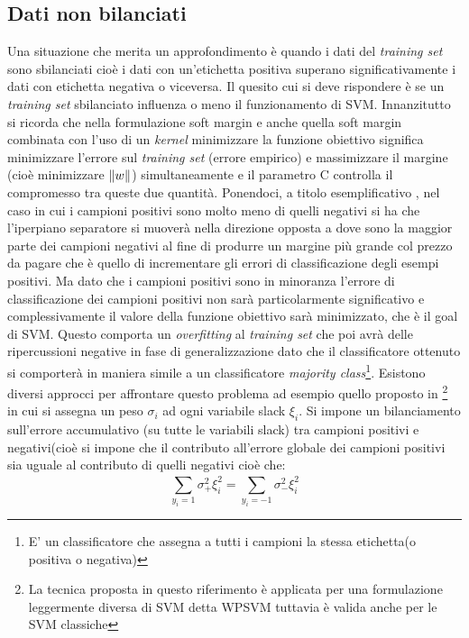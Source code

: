 \subsection{Dati non bilanciati}
\label{sub:unbalanced}
Una situazione che merita un approfondimento è quando i dati del \textit{training set} sono sbilanciati cioè  i dati con un'etichetta positiva superano significativamente i dati con etichetta negativa o viceversa. Il quesito cui si deve rispondere è se un \textit{training set} sbilanciato influenza o meno il funzionamento di \ac{SVM}. Innanzitutto si ricorda che nella formulazione soft margin e anche quella soft margin combinata con l'uso di un \textit{kernel} minimizzare la funzione obiettivo significa minimizzare l'errore sul \textit{training set} (errore empirico) e massimizzare il margine (cioè minimizzare $\lVert w\rVert$) simultaneamente e il parametro C controlla il compromesso tra queste due quantità. Ponendoci, a titolo esemplificativo , nel caso in cui i campioni positivi sono molto meno di quelli negativi si ha che l'iperpiano separatore si muoverà nella direzione opposta a dove sono la maggior parte dei campioni negativi al fine di produrre un margine più grande col prezzo da pagare che è quello di incrementare gli errori di classificazione degli esempi positivi. Ma dato che i campioni positivi sono in minoranza l'errore di classificazione dei campioni positivi non sarà particolarmente significativo e complessivamente il valore della funzione obiettivo sarà minimizzato, che è il goal di \ac{SVM}. Questo comporta un \textit{overfitting} al \textit{training set} che poi avrà delle ripercussioni negative in fase di generalizzazione dato che il classificatore ottenuto si comporterà in maniera simile a un classificatore \textit{majority class}\footnote{E' un classificatore che assegna a tutti i campioni la stessa etichetta(o positiva o negativa)}. Esistono diversi approcci per affrontare questo problema ad esempio quello proposto in \cite{Zhang05}\footnote{La tecnica proposta in questo riferimento è applicata per una formulazione leggermente diversa di \ac{SVM} detta WPSVM tuttavia è valida anche per le \ac{SVM} classiche} in cui si assegna un peso $\sigma_i$ ad ogni variabile slack $\xi_i$.  Si impone un bilanciamento sull'errore accumulativo (su tutte le variabili slack) tra campioni positivi e negativi(cioè si impone che il contributo all'errore globale dei campioni positivi sia uguale al contributo di quelli negativi cioè che: 
\begin{equation*}
\sum_{y_{i}=1}^{}\sigma_{+}^{2}\xi_{i}^2=\sum_{y_{i}=-1}^{}\sigma_{-}^{2}\xi_{i}^2
\end{equation*}
